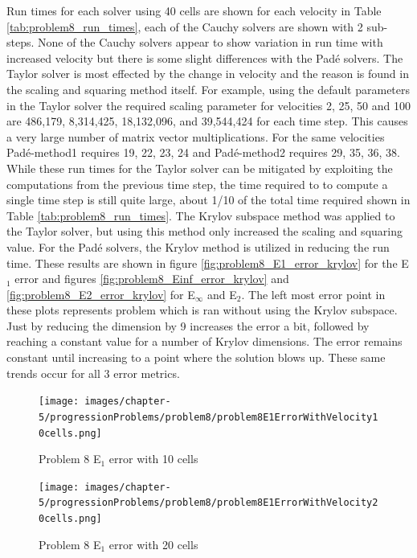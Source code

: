 Run times for each solver using 40 cells are shown for each velocity in Table \ref{tab:problem8_run_times}, each of the Cauchy solvers are shown with 2 sub-steps. None of the Cauchy solvers appear to show variation in run time with increased velocity but there is some slight differences with the Pad\'e solvers. The Taylor solver is most effected by the change in velocity and the reason is found in the scaling and squaring method itself. For example, using the default parameters in the Taylor solver the required scaling parameter for velocities 2, 25, 50 and 100 are 486,179, 8,314,425, 18,132,096, and 39,544,424 for each time step. This causes a very large number of matrix vector multiplications. For the same velocities Pad\'e-method1 requires 19, 22, 23, 24 and Pad\'e-method2 requires 29, 35, 36, 38. While these run times for the Taylor solver can be mitigated by exploiting the computations from the previous time step, the time required to to compute a single time step is still quite large, about 1/10 of the total time required shown in Table \ref{tab:problem8_run_times}. The Krylov subspace method was applied to the Taylor solver, but using this method only increased the scaling and squaring value. For the Pad\'e solvers, the Krylov method is utilized in reducing the run time. These results are shown in figure \ref{fig:problem8_E1_error_krylov} for the E$_{1}$ error and figures \ref{fig:problem8_Einf_error_krylov} and \ref{fig:problem8_E2_error_krylov} for E$_{\infty}$ and E$_{2}$. The left most error point in these plots represents problem which is ran without using the Krylov subspace. Just by reducing the dimension by 9 increases the error a bit, followed by reaching a constant value for a number of Krylov dimensions. The error remains constant until increasing to a point where the solution blows up. These same trends occur for all 3 error metrics. 

\clearpage

\begin{figure}[p]
    \centering
    \texttt{[image: images/chapter-5/progressionProblems/problem8/problem8E1ErrorWithVelocity10cells.png]}
    \caption{Problem 8 E${}_{1}$ error with 10 cells}
    \label{fig:problem8_E1_error_10cells}
\end{figure}

\clearpage

\begin{figure}[p]
    \centering
    \texttt{[image: images/chapter-5/progressionProblems/problem8/problem8E1ErrorWithVelocity20cells.png]}
    \caption{Problem 8 E${}_{1}$ error with 20 cells}
    \label{fig:problem8_E1_error_20cells}
\end{figure}

